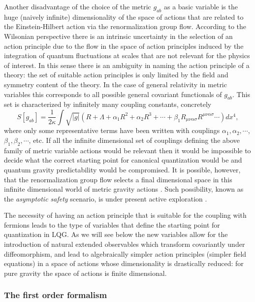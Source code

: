 \documentclass[aps, nofootinbib,superscriptaddress,12pt]{revtex4-2}
\def\be{\begin{equation}}
\def\ee{\end{equation}}
\begin{document}
Another disadvantage of the choice of the metric $g_{ab}$ as a basic variable is the huge (naively infinite) dimensionality of the space of actions that are
related to the Einstein-Hilbert action via the renormalization group flow. According to the Wilsonian perspective \cite{Wilson:1973jj} there is an intrinsic uncertainty in the 
selection of an action principle due to the flow in the space of action principles induced by the integration of quantum fluctuations at scales that are not relevant for the physics of interest. In this sense there is an ambiguity in naming the action principle of a theory: the set of suitable action principles is only limited by the field and symmetry content of the theory. In the case of general relativity in metric variables this corresponds to all possible general covariant functionals of $g_{ab}$. This set is characterized by infinitely many coupling constants, concretely
\be\label{action1}
S[g_{ab}]=\frac{1}{2 \kappa} \int \sqrt{|g|} \left(R+\Lambda+\alpha_1 R^2+\alpha_2 R^3+\cdots+\beta_1 R_{\mu\nu\alpha\sigma} R^{\mu\nu\alpha\sigma}\cdots\right) dx^4,
\ee 
where  only some representative terms have been written with couplings  $\alpha_1, \alpha_2,\cdots$, $\beta_1, \beta_2, \cdots$, etc.  If all the infinite dimensional set of couplings defining the above family of metric variable actions would be relevant then it would be impossible to decide what the correct starting point for canonical quantization would be and quantum gravity predictability would be compromised. It is possible, however, that the renormalization group flow selects a final dimensional 
space in this infinite dimensional world of metric gravity actions \cite{Weinberg:1980gg}. Such possibility, known as the {\em asymptotic safety} scenario, 
is under present active exploration \cite{Niedermaier:2006wt}.     

The necessity of having an action principle that is suitable for the coupling with fermions leads to the type of variables that define the starting point for quantization in LQG. As we will see below the new variables allow for the introduction of natural extended observables which transform covariantly under diffeomorphism, and lead to algebraically simpler action principles (simpler field equations) in a space of actions whose dimensionality is drastically reduced: for pure gravity the space of actions is finite dimensional.

\subsubsection{The first order formalism}
\end{document}
